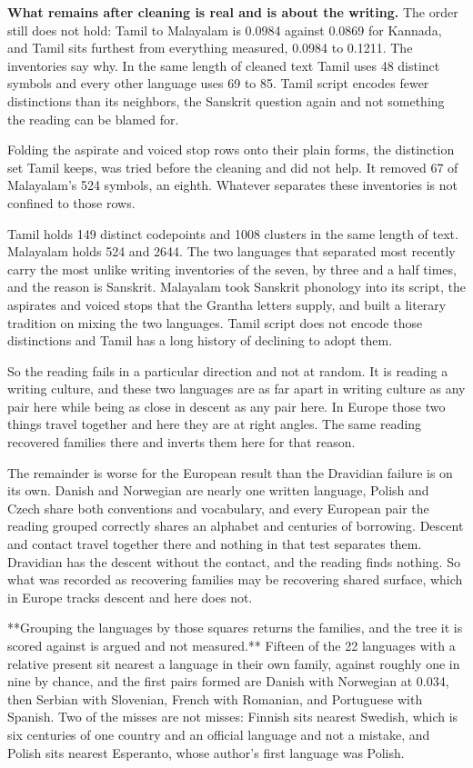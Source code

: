 \textbf{What remains after cleaning is real and is about the writing.} The order still does not hold: Tamil to Malayalam is 0.0984 against 0.0869 for Kannada, and Tamil sits furthest from everything measured, 0.0984 to 0.1211. The inventories say why. In the same length of cleaned text Tamil uses 48 distinct symbols and every other language uses 69 to 85. Tamil script encodes fewer distinctions than its neighbors, the Sanskrit question again and not something the reading can be blamed for.

Folding the aspirate and voiced stop rows onto their plain forms, the distinction set Tamil keeps, was tried before the cleaning and did not help. It removed 67 of Malayalam's 524 symbols, an eighth. Whatever separates these inventories is not confined to those rows.

Tamil holds 149 distinct codepoints and 1008 clusters in the same length of text. Malayalam holds 524 and 2644. The two languages that separated most recently carry the most unlike writing inventories of the seven, by three and a half times, and the reason is Sanskrit. Malayalam took Sanskrit phonology into its script, the aspirates and voiced stops that the Grantha letters supply, and built a literary tradition on mixing the two languages. Tamil script does not encode those distinctions and Tamil has a long history of declining to adopt them.

So the reading fails in a particular direction and not at random. It is reading a writing culture, and these two languages are as far apart in writing culture as any pair here while being as close in descent as any pair here. In Europe those two things travel together and here they are at right angles. The same reading recovered families there and inverts them here for that reason.

The remainder is worse for the European result than the Dravidian failure is on its own. Danish and Norwegian are nearly one written language, Polish and Czech share both conventions and vocabulary, and every European pair the reading grouped correctly shares an alphabet and centuries of borrowing. Descent and contact travel together there and nothing in that test separates them. Dravidian has the descent without the contact, and the reading finds nothing. So what was recorded as recovering families may be recovering shared surface, which in Europe tracks descent and here does not.

**Grouping the languages by those squares returns the families, and the tree it is scored against is argued and not measured.** Fifteen of the 22 languages with a relative present sit nearest a language in their own family, against roughly one in nine by chance, and the first pairs formed are Danish with Norwegian at 0.034, then Serbian with Slovenian, French with Romanian, and Portuguese with Spanish. Two of the misses are not misses: Finnish sits nearest Swedish, which is six centuries of one country and an official language and not a mistake, and Polish sits nearest Esperanto, whose author's first language was Polish.

